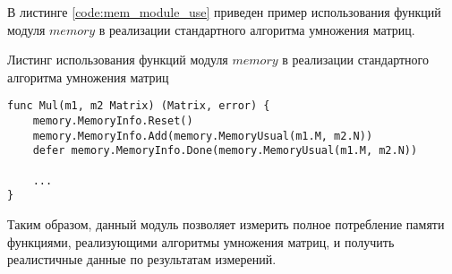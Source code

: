 В листинге \ref{code:mem_module_use} приведен пример использования функций модуля $memory$ в реализации стандартного алгоритма умножения матриц.

\newpage

\begin{code}
\caption{Листинг использования функций модуля $memory$ в реализации стандартного алгоритма умножения матриц}
\label{code:mem_module_use}

\begin{verbatim}
func Mul(m1, m2 Matrix) (Matrix, error) {
	memory.MemoryInfo.Reset()
	memory.MemoryInfo.Add(memory.MemoryUsual(m1.M, m2.N))
	defer memory.MemoryInfo.Done(memory.MemoryUsual(m1.M, m2.N))

	...
}
\end{verbatim}
\end{code}

Таким образом, данный модуль позволяет измерить полное потребление памяти функциями, реализующими алгоритмы умножения матриц, и получить реалистичные данные по результатам измерений.


